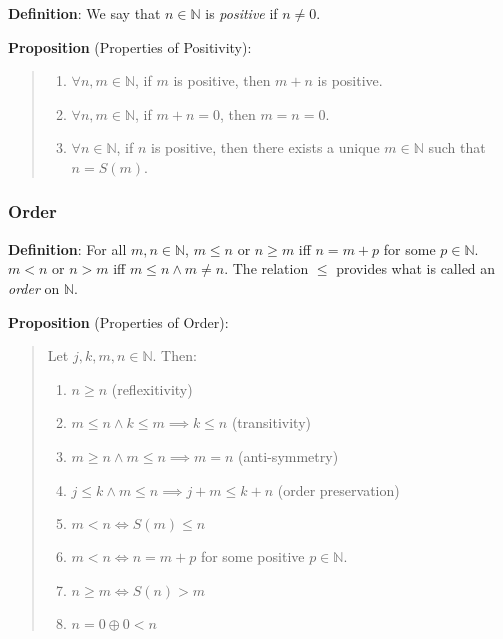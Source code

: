 \documentclass[11pt]{article}
\begin{document}
\textbf{Definition}: We say that $n \in \mathbb{N}$ is \emph{positive} if $n \neq 0$.

\textbf{Proposition} (Properties of Positivity):
\begin{quote}\vspace{-0.3cm}
	\begin{enumerate}
	\item $\forall n, m \in \mathbb{N}$, if $m$ is positive, then $m + n$ is positive.
	\item $\forall n, m \in \mathbb{N}$, if $m + n = 0$, then $m = n = 0$.
	\item $\forall n \in \mathbb{N}$, if $n$ is positive, then there exists a unique $m \in \mathbb{N}$ such that $n = S(m)$.
	\end{enumerate}
\end{quote}

\subsubsection{Order}

\textbf{Definition}: For all $m, n \in \mathbb{N}$, $m \leq n$ or $n \geq m$ iff $n = m + p$ for some $p \in \mathbb{N}$.\\
\hspace{0.5cm}$m < n$ or $n > m$ iff $m \leq n \land m \neq n$. The relation $\leq$ provides what is called an \emph{order} on $\mathbb{N}$.

\textbf{Proposition} (Properties of Order):
\begin{quote}\vspace{-0.3cm}
	Let $j,k,m,n \in \mathbb{N}$. Then:
	\begin{enumerate}
	\item $n \geq n$ (reflexitivity)
	\item $m \leq n \land k \leq m \implies k \leq n$ (transitivity)
	\item $m \geq n \land m \leq n \implies m = n$ (anti-symmetry)
	\item $j \leq k \land m \leq n \implies j + m \leq k + n$ (order preservation)
	\item $m < n \iff S(m) \leq n$
	\item $m < n \iff n = m + p$ for some positive $p \in \mathbb{N}$.
	\item $n \geq m \iff S(n) > m$
	\item $n = 0 \oplus 0 < n$
	\end{enumerate}
\end{quote}
\end{document}
